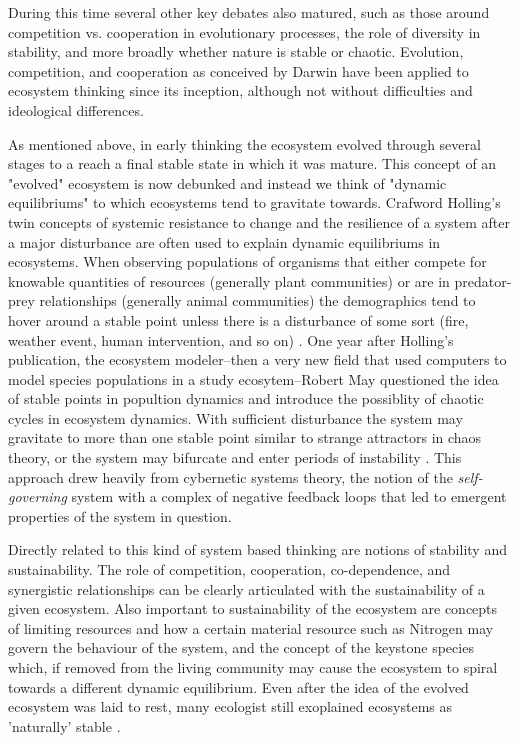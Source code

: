 During this time several other key debates also matured, such as those around competition vs. cooperation in evolutionary processes, the role of diversity in stability, and more broadly whether nature is stable or chaotic. Evolution, competition, and cooperation as conceived by Darwin have been applied to ecosystem thinking since its inception, although not without difficulties and ideological differences. 

As mentioned above, in early thinking the ecosystem evolved through several stages to a reach a final stable state in which it was mature. This concept of an "evolved" ecosystem is now debunked and instead we think of "dynamic equilibriums" to which ecosystems tend to gravitate towards. Crafword Holling's twin concepts of systemic resistance to change and the resilience of a system after a major disturbance are often used to explain dynamic equilibriums in ecosystems. When observing populations of organisms that either compete for knowable quantities of resources (generally plant communities) or are in predator-prey relationships (generally animal communities) the demographics tend to hover around a stable point unless there is a disturbance of some sort (fire, weather event, human intervention, and so on) \cite{holling_1973}. One year after Holling's publication, the ecosystem modeler--then a very new field that used computers to model species populations in a study ecosytem--Robert May questioned the idea of stable points in popultion dynamics and introduce the possiblity of chaotic cycles in ecosystem dynamics. With sufficient disturbance the system may gravitate to more than one stable point similar to strange attractors in chaos theory, or the system may bifurcate and enter periods of instability \cite{may_1974}. This approach drew heavily from cybernetic systems theory, the notion of the \textit{self-governing} system with a complex of negative feedback loops that led to emergent properties of the system in question. 



Directly related to this kind of system based thinking are notions of stability and sustainability. The role of competition, cooperation, co-dependence, and synergistic relationships can be clearly articulated with the sustainability of a given ecosystem. Also important to sustainability of the ecosystem are concepts of limiting resources and how a certain material resource such as Nitrogen may govern the behaviour of the system, and the concept of the keystone species which, if removed from the living community may cause the ecosystem to spiral towards a different dynamic equilibrium. Even after the idea of the evolved ecosystem was laid to rest, many ecologist still exoplained ecosystems as 'naturally' stable \cite{odum_1953}.  


